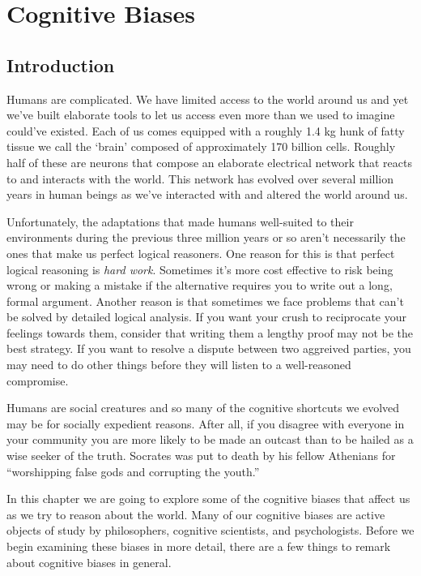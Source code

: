 \chapter{Cognitive Biases}
\label{ch:cognitivebiases}
\setlength{\parindent}{1em}

\section{Introduction}

Humans are complicated. We have limited access to the world around us and yet we've built elaborate tools to let us access even more than we used to imagine could've existed. Each of us comes equipped with a roughly 1.4 kg hunk of fatty tissue we call the `brain' composed of approximately 170 billion cells. Roughly half of these are neurons that compose an elaborate electrical network that reacts to and interacts with the world. This network has evolved over several million years in human beings as we've interacted with and altered the world around us.

Unfortunately, the adaptations that made humans well-suited to their environments during the previous three million years or so aren't necessarily the ones that make us perfect logical reasoners. One reason for this is that perfect logical reasoning is \emph{hard work}. Sometimes it's more cost effective to risk being wrong or making a mistake if the alternative requires you to write out a long, formal argument. Another reason is that sometimes we face problems that can't be solved by detailed logical analysis. If you want your crush to reciprocate your feelings towards them, consider that writing them a lengthy proof may not be the best strategy. If you want to resolve a dispute between two aggreived parties, you may need to do other things before they will listen to a well-reasoned compromise.

Humans are social creatures and so many of the cognitive shortcuts we evolved may be for socially expedient reasons. After all, if you disagree with everyone in your community you are more likely to be made an outcast than to be hailed as a wise seeker of the truth. Socrates was put to death by his fellow Athenians for ``worshipping false gods and corrupting the youth.''

In this chapter we are going to explore some of the cognitive biases that affect us as we try to reason about the world. Many of our cognitive biases are active objects of study by philosophers, cognitive scientists, and psychologists. Before we begin examining these biases in more detail, there are a few things to remark about cognitive biases in general.

